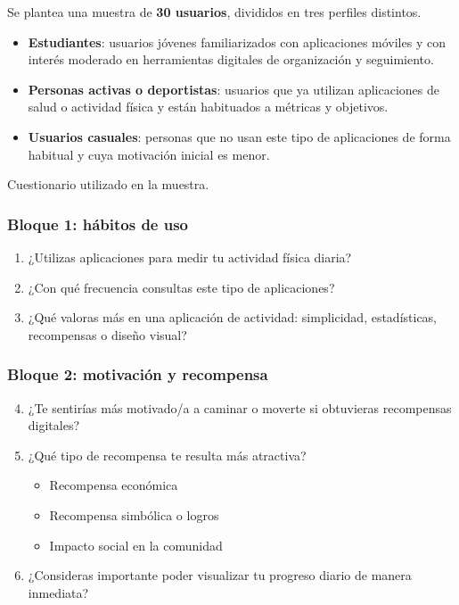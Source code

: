 \documentclass[12pt, a4paper]{article}
\begin{document}
Se plantea una muestra de \textbf{30 usuarios}, divididos en tres perfiles distintos.

\begin{itemize}
    \item \textbf{Estudiantes}: usuarios jóvenes familiarizados con aplicaciones móviles y con interés moderado en herramientas digitales de organización y seguimiento.
    \item \textbf{Personas activas o deportistas}: usuarios que ya utilizan aplicaciones de salud o actividad física y están habituados a métricas y objetivos.
    \item \textbf{Usuarios casuales}: personas que no usan este tipo de aplicaciones de forma habitual y cuya motivación inicial es menor.
\end{itemize}

Cuestionario utilizado en la muestra.

\subsubsection{Bloque 1: hábitos de uso}

\begin{enumerate}[label=\arabic*.]
    \item ¿Utilizas aplicaciones para medir tu actividad física diaria?
    \item ¿Con qué frecuencia consultas este tipo de aplicaciones?
    \item ¿Qué valoras más en una aplicación de actividad: simplicidad, estadísticas, recompensas o diseño visual?
\end{enumerate}

\subsubsection{Bloque 2: motivación y recompensa}

\begin{enumerate}[label=\arabic*.]
    \setcounter{enumi}{3}
    \item ¿Te sentirías más motivado/a a caminar o moverte si obtuvieras recompensas digitales?
    \item ¿Qué tipo de recompensa te resulta más atractiva?
    \begin{itemize}
        \item Recompensa económica
        \item Recompensa simbólica o logros
        \item Impacto social en la comunidad
    \end{itemize}
    \item ¿Consideras importante poder visualizar tu progreso diario de manera inmediata?
\end{enumerate}
\end{document}
